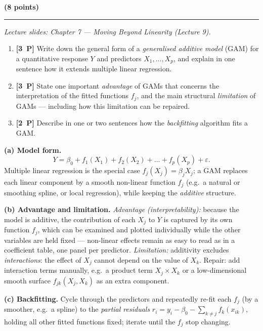 \documentclass[11pt,a4paper]{article}
\newcommand{\problem}[2]{\par\vspace{7mm}\noindent{\large\textbf{Problem #1}}%
  \hfill{\large\textbf{(#2 points)}}\par\nopagebreak\vspace{0.6mm}%
  \noindent\rule{\textwidth}{0.6pt}\par\nopagebreak\vspace{2.5mm}}
\newcommand{\pp}[1]{\textbf{[#1~P]}\enspace}
\begin{document}
\problem{2: Generalised additive models}{8}
{\small\itshape Lecture slides: Chapter 7 --- Moving Beyond Linearity (Lecture 9).}\par\vspace{1mm}

\begin{enumerate}[label=(\alph*),leftmargin=7mm,itemsep=2.5mm]
  \item \pp{3} Write down the general form of a \emph{generalised additive model} (GAM) for a
    quantitative response $Y$ and predictors $X_1,\dots,X_p$, and explain in one sentence how it
    extends multiple linear regression.
  \item \pp{3} State one important \emph{advantage} of GAMs that concerns the interpretation of
    the fitted functions $f_j$, and the main structural \emph{limitation} of GAMs --- including
    how this limitation can be repaired.
  \item \pp{2} Describe in one or two sentences how the \emph{backfitting} algorithm fits a GAM.
\end{enumerate}

\ifdefined\withsolutions
\begin{solutionbox}
\textbf{(a) Model form.}
\[
  Y=\beta_0+f_1(X_1)+f_2(X_2)+\dots+f_p(X_p)+\varepsilon .
\]
Multiple linear regression is the special case $f_j(X_j)=\beta_jX_j$; a GAM replaces each linear
component by a smooth non-linear function $f_j$ (e.g.\ a natural or smoothing spline, or local
regression), while keeping the \emph{additive} structure.

\medskip
\textbf{(b) Advantage and limitation.}
\emph{Advantage (interpretability):} because the model is additive, the contribution of each
$X_j$ to $Y$ is captured by its own function $f_j$, which can be examined and plotted
individually while the other variables are held fixed --- non-linear effects remain as easy to
read as in a coefficient table, one panel per predictor.
\emph{Limitation:} additivity excludes \emph{interactions}: the effect of $X_j$ cannot depend
on the value of $X_k$. Repair: add interaction terms manually, e.g.\ a product term
$X_j\times X_k$ or a low-dimensional smooth surface $f_{jk}(X_j,X_k)$ as an extra component.

\medskip
\textbf{(c) Backfitting.}
Cycle through the predictors and repeatedly re-fit each $f_j$ (by a smoother, e.g.\ a spline)
to the \emph{partial residuals} $r_i=y_i-\beta_0-\sum_{k\ne j}f_k(x_{ik})$, holding all other
fitted functions fixed; iterate until the $f_j$ stop changing.
\end{solutionbox}
\fi
\end{document}
